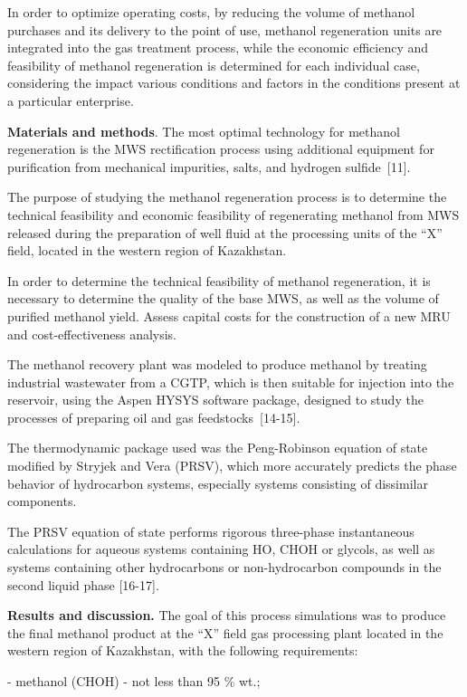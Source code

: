 In order to optimize operating costs, by reducing the volume of methanol
purchases and its delivery to the point of use, methanol regeneration
units are integrated into the gas treatment process, while the economic
efficiency and feasibility of methanol regeneration is determined for
each individual case, considering the impact various conditions and
factors in the conditions present at a particular enterprise.

{\bfseries Materials and methods}. The most optimal technology for methanol
regeneration is the MWS rectification process using additional equipment
for purification from mechanical impurities, salts, and hydrogen
sulfide~{[}11{]}.

The purpose of studying the methanol regeneration process is to
determine the technical feasibility and economic feasibility of
regenerating methanol from MWS released during the preparation of well
fluid at the processing units of the ``X'' field, located in the western
region of Kazakhstan.

In order to determine the technical feasibility of methanol
regeneration, it is necessary to determine the quality of the base MWS,
as well as the volume of purified methanol yield. Assess capital costs
for the construction of a new MRU and cost-effectiveness analysis.

The methanol recovery plant was modeled to produce methanol by treating
industrial wastewater from a CGTP, which is then suitable for injection
into the reservoir, using the Aspen HYSYS software package, designed to
study the processes of preparing oil and gas feedstocks~{[}14-15{]}.

The thermodynamic package used was the Peng-Robinson equation of state
modified by Stryjek and Vera (PRSV), which more accurately predicts the
phase behavior of hydrocarbon systems, especially systems consisting of
dissimilar components.

The PRSV equation of state performs rigorous three-phase instantaneous
calculations for aqueous systems containing HO,
CHOH or glycols, as well as systems containing other
hydrocarbons or non-hydrocarbon compounds in the second liquid phase
{[}16-17{]}.

{\bfseries Results and discussion.} The goal of this process simulations
was to produce the final methanol product at the ``X'' field gas
processing plant located in the western region of Kazakhstan, with the
following requirements:

- methanol (CHOH) - not less than 95 \% wt.;

